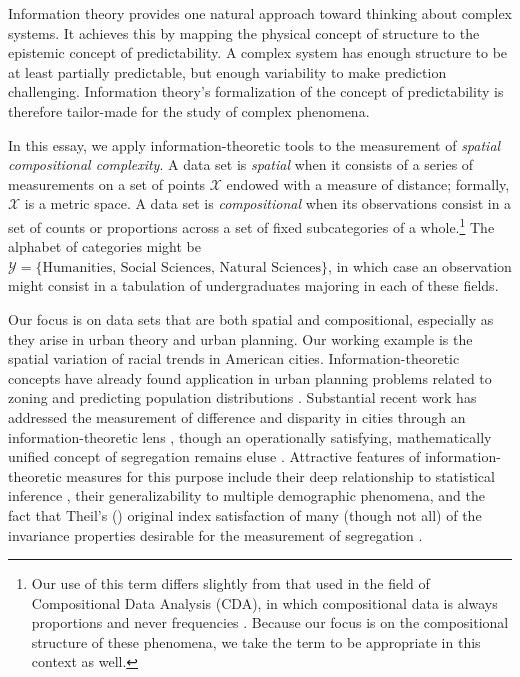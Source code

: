 	Information theory provides one natural approach toward thinking about complex systems. It achieves this by mapping the physical concept of structure to the epistemic concept of predictability. A complex system has enough structure to be at least partially predictable, but enough variability to make prediction challenging. Information theory's formalization of the concept of predictability is therefore tailor-made for the study of complex phenomena. 

	In this essay, we apply information-theoretic tools to the measurement of \emph{spatial compositional complexity}. A data set is \emph{spatial} when it consists of a series of measurements on a set of points $\mathcal{X}$ endowed with a measure of distance; formally, $\mathcal{X}$ is a metric space. A data set is \emph{compositional} when its observations consist in a set of counts or proportions across a set of fixed subcategories of a whole.\footnote{Our use of this term differs slightly from that used in the field of Compositional Data Analysis (CDA), in which compositional data is always proportions and never frequencies \cite{Aitchison1982,Aitchison2002}. Because our focus is on the compositional structure of these phenomena, we take the term to be appropriate in this context as well.} The alphabet of categories might be $\mathcal{Y} = \{\text{Humanities, Social Sciences, Natural Sciences}\}$, in which case an observation might consist in a tabulation of undergraduates majoring in each of these fields. 

	Our focus is on data sets that are both spatial and compositional, especially as they arise in urban theory and urban planning. Our working example is the spatial variation of racial trends in American cities. Information-theoretic concepts have already found application in urban planning problems related to zoning and predicting population distributions \cite{Royal2014,Batty1974,Batty1976,Battya}. Substantial recent work has addressed the measurement of difference and disparity in cities through an information-theoretic lens \cite{Theil1971,Bettencourt2015,Roberto2015a,Roberto2015}, though an operationally satisfying, mathematically unified concept of segregation remains eluse \cite{Press2009a}. Attractive features of information-theoretic measures for this purpose include their deep relationship to statistical inference \cite{Cover1991,Csiszzr2004}, their generalizability to multiple demographic phenomena, and the fact that Theil's (\cite{Theil1971}) original index satisfaction of many (though not all) of the invariance properties desirable for the measurement of segregation \cite{Reardon2002}. 

